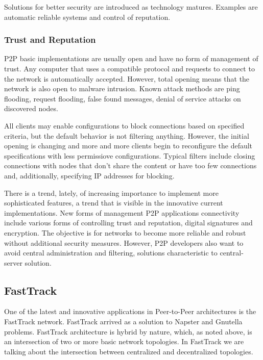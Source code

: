 Solutions for better security are introduced as technology matures. Examples
are automatic reliable systems and control of reputation.

\subsubsection{Trust and Reputation}

P2P basic implementations are usually open and have no form of management of
trust. Any computer that uses a compatible protocol and requests to connect to
the network is automatically accepted. However, total opening means that the
network is also open to malware intrusion. Known attack methods are ping
flooding, request flooding, false found messages, denial of service attacks on
discovered nodes.

All clients may enable configurations to block connections based on specified
criteria, but the default behavior is not filtering anything. However, the
initial opening is changing and more and more clients begin to reconfigure the
default specifications with less permissiove configurations. Typical filters
include closing connections with nodes that don't share the content or have
too few connections and, additionally, specifying IP addresses for blocking.

There is a trend, lately, of increasing importance to implement more
sophisticated features, a trend that is visible in the innovative current
implementations. New forms of management P2P applications connectivity include
various forms of controlling trust and reputation, digital signatures and
encryption. The objective is for networks to become more reliable and robust
without additional security measures. However, P2P developers also want to
avoid central administration and filtering, solutions characteristic to
central-server solution.

\subsection{FastTrack}

One of the latest and innovative  applications in Peer-to-Peer architectures
is the FastTrack network. FastTrack arrived as a solution to Napster and
Gnutella problems. FastTrack architecture is hybrid by nature, which, as noted
above, is an intersection of two or more basic network topologies. In
FastTrack we are talking about the intersection between centralized and
decentralized topologies.

